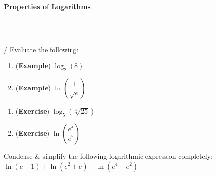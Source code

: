 \documentclass[10pt]{article}
\begin{document}
\newpage%

{\bf Properties of Logarithms}


\,\hfill 
{}
\hfill
{}
\hfill\,\\

\,\hfill
{}
\hfill
{}
\hfill
{}
\hfill\,


 /  Evaluate the following:\\

\begin{minipage}[t][2in]{0.47\textwidth}
\begin{enumerate}
\item[(a)] ({\bf\color{blue}Example}) $\log_2\left( 8\right)$
    \vfill

\item[(b)] ({\bf\color{blue}Example}) $\ln\left( \dfrac{1}{\sqrt{e}} \right)$
    \vfill

\end{enumerate}
\end{minipage}
%
\hfill
%
\begin{minipage}[t][2in]{0.5\textwidth}
\begin{enumerate}
\item[(c)] ({\bf\color{blue}Exercise}) $\log_5\left(\sqrt[3]{25}\right)$
    \vfill

\item[(d)] ({\bf\color{blue}Exercise}) $\ln\left( \dfrac{e^5}{e^7}\right)$
    \vfill

\end{enumerate}
\end{minipage}

 Condense \& simplify the following logarithmic expression completely:\\ 

$\ln(e-1) + \ln(e^2+e) - \ln(e^4-e^2)$
\end{document}
